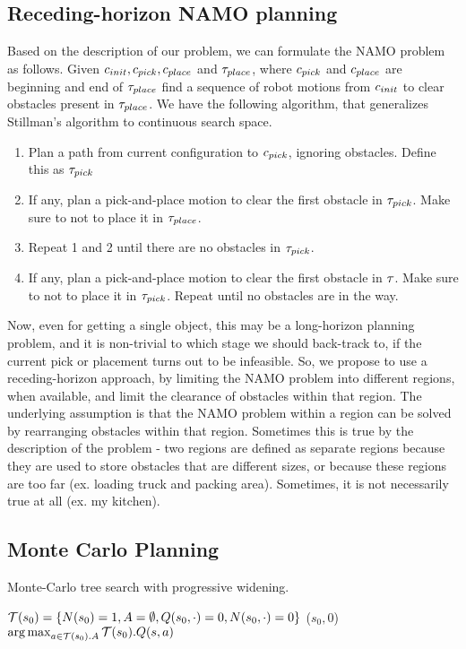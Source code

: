 \documentclass[10pt,letterpaper]{article}
\begin{document}
\subsection{Receding-horizon NAMO planning}
Based on the description of our problem, we can formulate the NAMO problem
as follows. Given $c_{init}, c_{pick}, c_{place}$ and $\tau_{place}$, 
where $c_{pick}$ and 
$c_{place}$  are beginning and end of $\tau_{place}$ find a sequence of 
robot motions from $c_{init}$ to clear obstacles present in $\tau_{place}$. 
We have the following algorithm, that generalizes Stillman's algorithm to continuous
search space.
\begin{enumerate}
\item Plan a path from current configuration to $c_{pick}$, ignoring obstacles.
Define this as $\tau_{pick}$
\item If any, plan a pick-and-place motion to clear the first obstacle in 
$\tau_{pick}$. Make sure to not to place it in $\tau_{place}$. 
\item Repeat 1 and 2 until there are no obstacles in $\tau_{pick}$.
\item If any, plan a pick-and-place motion to clear the first obstacle in 
$\tau$. Make sure to not to place it in $\tau_{pick}$. Repeat until
no obstacles are in the way.
\end{enumerate}
Now, even for getting a single object, this may be a long-horizon planning problem,
and it is non-trivial to which stage we should back-track to, if the current pick or
placement turns out to be infeasible. So, we propose to use a
 receding-horizon approach, by limiting
the NAMO problem into different regions, when available,
 and limit the clearance of obstacles within
that region.  The underlying assumption is that the NAMO problem within a region
can be solved by rearranging obstacles within that region. Sometimes this is
true by the description of the problem - two regions are defined as separate
regions because they are used to store obstacles that are different sizes,
or because these regions are too far (ex. loading truck and packing area).
Sometimes, it is not necessarily true at all (ex. my kitchen).

\subsection{Monte Carlo Planning}
Monte-Carlo tree search with progressive widening.
\begin{algorithm}[htb]
\small
   \caption{($s_0$)}
   \label{alg:search}
\begin{algorithmic}[1]
\STATE $\mathcal{T}(s_0) = \{ N(s_0)=1,A=\emptyset,Q(s_0,\cdot)=0,N(s_0,\cdot)=0 \}$
\REPEAT
{}($s_0,0$)
 $\operatorname{arg\,max}_{a\in\mathcal{T}(s_0).A} \mathcal{T}(s_0).Q(s,a)$
\end{algorithmic}
\end{algorithm}
\end{document}
